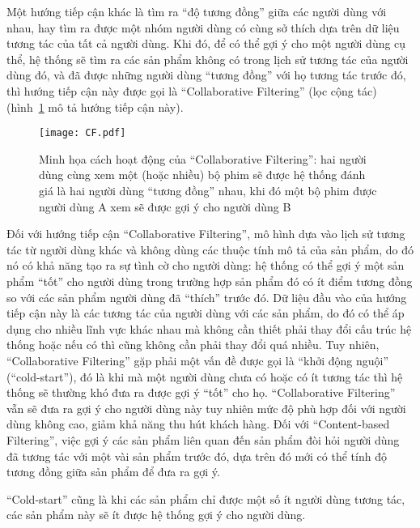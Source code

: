 Một hướng tiếp cận khác là tìm ra ``độ tương đồng'' giữa các người dùng với nhau, hay tìm ra được một nhóm người dùng
có cùng sở thích dựa trên dữ liệu tương tác của tất cả người dùng. Khi đó, để có thể gợi ý cho một người dùng cụ thể,
hệ thống sẽ tìm ra các sản phẩm không có trong lịch sử tương tác của người dùng đó, và đã được những người dùng ``tương đồng'' với họ tương tác trước đó,
thì hướng tiếp cận này được gọi là ``Collaborative Filtering'' (lọc cộng tác) (hình~\ref{fig_CF} mô tả hướng tiếp cận này).
\begin{figure}
    \centering
    \texttt{[image: CF.pdf]}
    \caption[Minh họa cách hoạt động của ``Collaborative Filtering'']{Minh họa cách hoạt động của ``Collaborative Filtering'': hai người dùng cùng xem một (hoặc nhiều) bộ phim 
    sẽ được hệ thống đánh giá là hai người dùng ``tương đồng'' nhau, khi đó một bộ phim được
    người dùng A xem sẽ được gợi ý cho người dùng B}
    \label{fig_CF}
\end{figure}
Đối với hướng tiếp cận ``Collaborative Filtering'', mô hình dựa vào lịch sử tương tác từ người dùng khác
và không dùng các thuộc tính mô tả của sản phẩm, do đó nó có khả năng tạo ra sự tình cờ cho người dùng:
hệ thống có thể gợi ý một sản phẩm ``tốt'' cho người dùng trong trường hợp sản phẩm đó có ít điểm tương đồng
so với các sản phẩm người dùng đã ``thích'' trước đó. Dữ liệu đầu vào của hướng tiếp cận này là các tương tác
của người dùng với các sản phẩm, do đó có thể áp dụng cho nhiều lĩnh vực khác nhau mà không cần thiết phải thay đổi cấu trúc hệ thống 
hoặc nếu có thì cũng không cần phải thay đổi quá nhiều.
Tuy nhiên, ``Collaborative Filtering'' gặp phải một vấn đề được gọi là ``khởi động nguội'' (``cold-start''),
đó là khi mà một người dùng chưa có hoặc có ít tương tác thì hệ thống sẽ thường khó đưa ra được gợi ý ``tốt'' cho họ. ``Collaborative Filtering'' vẫn sẽ đưa ra gợi ý cho người dùng này tuy nhiên mức độ phù hợp đối với người dùng không cao, giảm khả năng thu hút khách hàng.
Đối với ``Content-based Filtering'', việc gợi ý các sản phẩm liên quan đến sản phẩm đòi hỏi người dùng đã tương tác với một vài sản phẩm trước đó, dựa trên đó mới có thể tính độ tương đồng giữa sản phẩm để đưa ra gợi ý.

``Cold-start'' cũng là khi các sản phẩm chỉ được một số ít người dùng tương tác, các sản phẩm này sẽ ít được hệ thống gợi ý cho người dùng.

